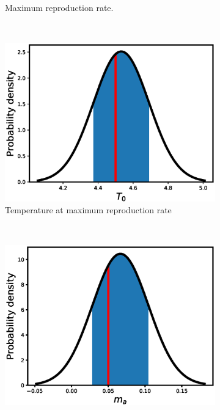 \documentclass[12pt, table]{article}
\begin{document}
\begin{figure}[H]
\begin{subfigure}[b]{0.45\textwidth}
       \caption{Maximum reproduction  rate.}
       \label{fig2c}
   \end{subfigure}
   ~ %
   \begin{subfigure}[b]{0.45\textwidth}
       \includegraphics[width=1\textwidth, height=0.23\textheight]{figexple1/fT0}
        \caption{Temperature at maximum reproduction rate}
       \label{fig2d}
   \end{subfigure}\\
   \begin{subfigure}[b]{0.45\textwidth}
       \includegraphics[width=1\textwidth, height=0.24\textheight]{figexple1/fmj}

\end{subfigure}
\end{figure}
\end{document}
